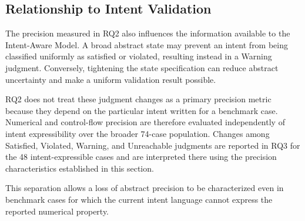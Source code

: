 \documentclass[11pt,oneside]{report}
\theoremstyle{plain}
\theoremstyle{definition}
\theoremstyle{remark}
\begin{document}


\subsection{Relationship to Intent Validation}
\label{subsec:eval:rq2:intent}

The precision measured in RQ2 also influences the information available to the Intent-Aware Model. A broad abstract state may prevent an intent from being classified uniformly as satisfied or violated, resulting instead in a Warning judgment. Conversely, tightening the state specification can reduce abstract uncertainty and make a uniform validation result possible.

RQ2 does not treat these judgment changes as a primary precision metric because they depend on the particular intent written for a benchmark case. Numerical and control-flow precision are therefore evaluated independently of intent expressibility over the broader 74-case population. Changes among Satisfied, Violated, Warning, and Unreachable judgments are reported in RQ3 for the 48 intent-expressible cases and are interpreted there using the precision characteristics established in this section.

This separation allows a loss of abstract precision to be characterized even in benchmark cases for which the current intent language cannot express the reported numerical property.

\end{document}
